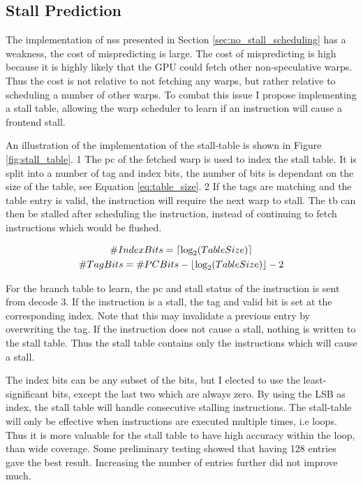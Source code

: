 \subsection{Stall Prediction}

The implementation of \acrshort{nss} presented in Section \ref{sec:no_stall_scheduling} has a weakness, the cost of mispredicting is large. The cost of mispredicting is high because it is highly likely that the GPU could fetch other non-speculative warps. Thus the cost is not relative to not fetching any warps, but rather relative to scheduling a number of other warps. To combat this issue I propose implementing a stall table, allowing the warp scheduler to learn if an instruction will cause a frontend stall.

An illustration of the implementation of the stall-table is shown in Figure \ref{fig:stall_table}. \textcircled{\small{1}} The \acrshort{pc} of the fetched warp is used to index the stall table. It is split into a number of tag and index bits, the number of bits is dependant on the size of the table, see Equation \ref{eq:table_size}. \textcircled{\small{2}} If the tags are matching and the table entry is valid, the instruction will require the next warp to stall. The \acrshort{tb} can then be stalled after scheduling the instruction, instead of continuing to fetch instructions which would be flushed.

\begin{equation} \label{eq:table_size}
\begin{gathered}
    \#IndexBits = \ceil*{\text{log}_2(TableSize)} \\
    \#TagBits = \#PCBits - \floor*{\text{log}_2(TableSize)} - 2
\end{gathered}
\end{equation}

For the branch table to learn, the \acrshort{pc} and stall status of the instruction is sent from decode \textcircled{\small{3}}. If the instruction is a stall, the tag and valid bit is set at the corresponding index. Note that this may invalidate a previous entry by overwriting the tag. If the instruction does not cause a stall, nothing is written to the stall table. Thus the stall table contains only the instructions which will cause a stall.

The index bits can be any subset of the bits, but I elected to use the least-significant bits, except the last two which are always zero. By using the LSB as index, the stall table will handle consecutive stalling instructions. The stall-table will only be effective when instructions are executed multiple times, i.e loops. Thus it is more valuable for the stall table to have high accuracy within the loop, than wide coverage. Some preliminary testing showed that having 128 entries gave the best result. Increasing the number of entries further did not improve much. 

